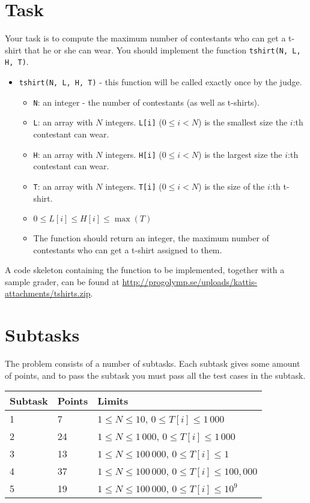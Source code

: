 \section*{Task}
Your task is to compute the maximum number of contestants who can get a t-shirt that he or she can wear.
You should implement the function \texttt{tshirt(N, L, H, T)}.
\begin{itemize}
  \item \texttt{tshirt(N, L, H, T)} - this function will be called exactly once by the judge.
  \begin{itemize}
    \item \texttt{N}: an integer - the number of contestants (as well as t-shirts).
    \item \texttt{L}: an array with $N$ integers. \texttt{L[i]} ($0 \le i < N$) is the smallest size the $i$:th contestant can wear.
    \item \texttt{H}: an array with $N$ integers. \texttt{H[i]} ($0 \le i < N$) is the largest size the $i$:th contestant can wear.
    \item \texttt{T}: an array with $N$ integers. \texttt{T[i]} ($0 \le i < N$) is the size of the $i$:th t-shirt.
    \item $0 \le L[i] \le H[i] \le \max(T)$
    \item The function should return an integer, the maximum number of contestants who can get a t-shirt assigned to them.
  \end{itemize}
\end{itemize}

A code skeleton containing the function to be implemented, together with a sample grader, can be found at
\url{http://progolymp.se/uploads/kattis-attachments/tshirts.zip}.

\section*{Subtasks}
The problem consists of a number of subtasks. Each subtask gives some amount of points, and to pass
the subtask you must pass all the test cases in the subtask.

\begin{tabular}{|l|l|l|}
  \hline
  \textbf{Subtask} & \textbf{Points} & \textbf{Limits} \\ \hline
  1 & 7 & $1 \le N \le 10$, $0 \le T[i] \le 1\,000$ \\ \hline
  2 & 24 & $1 \le N \le 1\,000$, $0 \le T[i] \le 1\,000$ \\ \hline
  3 & 13 & $1 \le N \le 100\,000$, $0 \le T[i] \le 1$ \\ \hline
  4 & 37 & $1 \le N \le 100\,000$, $0 \le T[i] \le 100,000$ \\ \hline
  5 & 19 & $1 \le N \le 100\,000$, $0 \le T[i] \le 10^9$ \\ \hline
\end{tabular}

